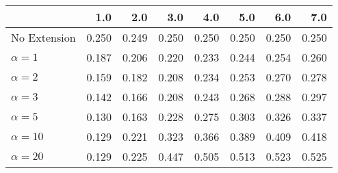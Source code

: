 \begin{tabular}{lrrrrrrr}
\toprule
{} &   1.0 &   2.0 &   3.0 &   4.0 &   5.0 &   6.0 &   7.0 \\
\midrule
No Extension  & 0.250 & 0.249 & 0.250 & 0.250 & 0.250 & 0.250 & 0.250 \\
$\alpha = 1$  & 0.187 & 0.206 & 0.220 & 0.233 & 0.244 & 0.254 & 0.260 \\
$\alpha = 2$  & 0.159 & 0.182 & 0.208 & 0.234 & 0.253 & 0.270 & 0.278 \\
$\alpha = 3$  & 0.142 & 0.166 & 0.208 & 0.243 & 0.268 & 0.288 & 0.297 \\
$\alpha = 5$  & 0.130 & 0.163 & 0.228 & 0.275 & 0.303 & 0.326 & 0.337 \\
$\alpha = 10$ & 0.129 & 0.221 & 0.323 & 0.366 & 0.389 & 0.409 & 0.418 \\
$\alpha = 20$ & 0.129 & 0.225 & 0.447 & 0.505 & 0.513 & 0.523 & 0.525 \\
\bottomrule
\end{tabular}
